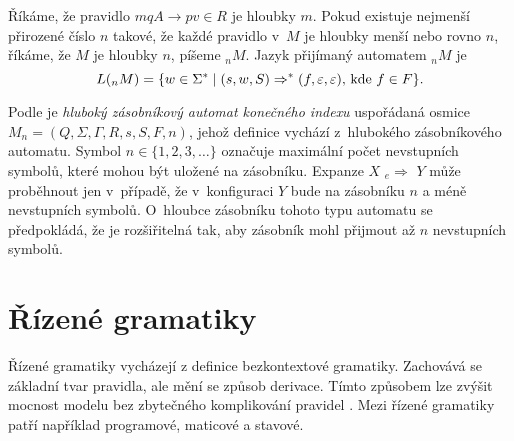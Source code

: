 \begin{Def}
Říkáme, že pravidlo $mqA \rightarrow pv \in R$ je hloubky $m$. Pokud existuje nejmenší přirozené číslo $n$ takové, že každé pravidlo v~$M$ je hloubky menší nebo rovno $n$, říkáme, že $M$ je hloubky $n$, píšeme ${}_nM$. Jazyk přijímaný automatem ${}_nM$ je
    $$L({}_nM) = \{ w \in \Sigma^* \mid (s,w,S) \Rightarrow^* (f, \varepsilon, \varepsilon)\textnormal{, kde }f \in F \}.$$


\end{Def}


\begin{Def} Podle \cite{Meduna:FinitelyDeepPDA} je \emph{hluboký zásobníkový automat konečného indexu} uspořádaná osmice $M_n = (Q,\Sigma,\Gamma, R, s, S, F, n)$, jehož definice vychází z~hlubokého zásobníkového automatu. Symbol $n \in \{1,2,3,\dots\}$ označuje maximální počet nevstupních symbolů, které mohou být uložené na zásobníku. Expanze $X$  ${}_e{\Rightarrow}$  $Y$ může proběhnout jen v~případě, že v~konfiguraci $Y$ bude na zásobníku $n$ a méně nevstupních symbolů.  O~hloubce zásobníku tohoto typu automatu se předpokládá, že je rozšiřitelná tak, aby zásobník mohl přijmout až $n$ nevstupních symbolů.



\end{Def}


\section{Řízené gramatiky}

Řízené gramatiky vycházejí z definice bezkontextové gramatiky. Zachovává se základní tvar pravidla, ale mění se způsob derivace. Tímto způsobem lze zvýšit mocnost modelu bez zbytečného komplikování pravidel \cite{Krivka}. Mezi řízené gramatiky patří například programové, maticové a stavové.  

